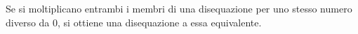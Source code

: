 Se si moltiplicano entrambi i membri di una disequazione 
per uno stesso numero diverso da $0$, 
si ottiene una disequazione a essa equivalente.